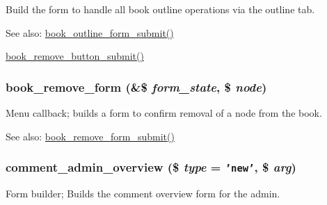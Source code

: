 Build the form to handle all book outline operations via the outline tab.

\begin{Desc}
\item[See also:]\hyperlink{book_8pages_8inc_d5f27af5889dbe2ad72df81fd4cd2665}{book\_\-outline\_\-form\_\-submit()} 

\hyperlink{book_8pages_8inc_bcf4790efab7bbb44fda88de9ed0847e}{book\_\-remove\_\-button\_\-submit()} \end{Desc}
\hypertarget{group__forms_g4cd634d95539957d72f2efbe228769f7}{
\subsubsection[{book\_\-remove\_\-form}]{\setlength{\rightskip}{0pt plus 5cm}book\_\-remove\_\-form (\&\$ {\em form\_\-state}, \/  \$ {\em node})}}
\label{group__forms_g4cd634d95539957d72f2efbe228769f7}


Menu callback; builds a form to confirm removal of a node from the book.

\begin{Desc}
\item[See also:]\hyperlink{book_8pages_8inc_ca2b07a50dae6ef3a271b984dae19c7e}{book\_\-remove\_\-form\_\-submit()} \end{Desc}
\hypertarget{group__forms_g00b5469fd2c8930040e5e3170a8ac0bd}{
\subsubsection[{comment\_\-admin\_\-overview}]{\setlength{\rightskip}{0pt plus 5cm}comment\_\-admin\_\-overview (\$ {\em type} = {\tt 'new'}, \/  \$ {\em arg})}}
\label{group__forms_g00b5469fd2c8930040e5e3170a8ac0bd}


Form builder; Builds the comment overview form for the admin.

